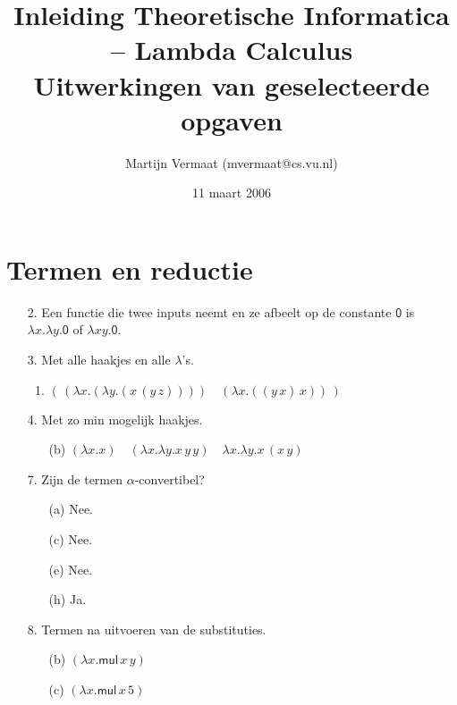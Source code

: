\documentclass[a4paper,11pt]{article}
\title{Inleiding Theoretische Informatica -- Lambda Calculus\\
\normalsize{Uitwerkingen van geselecteerde opgaven}}
\author{Martijn Vermaat (mvermaat@cs.vu.nl)}
\date{11 maart 2006}
\begin{document}
\maketitle


\section{Termen en reductie}


\begin{enumerate}


\item[2.]
Een functie die twee inputs neemt en ze afbeelt op de constante $\textsf{0}$ is
$\lambda x. \lambda y. \textsf{0}$ of $\lambda xy. \textsf{0}$.


\item[3.]
Met alle haakjes en alle $\lambda$'s.
\begin{enumerate}

\item
$( \, (\lambda x. (\lambda y. (x \, (y \, z)))) \quad (\lambda x. ((y \, x) \, x)) \, )$

\end{enumerate}


\item[4.]
Met zo min mogelijk haakjes.
\begin{enumerate}

\item[(b)]
$(\lambda x. x) \quad (\lambda x. \lambda y. x \, y \, y) \quad \lambda x. \lambda y. x \, (x \, y)$

\end{enumerate}


\item[7.]
Zijn de termen $\alpha$-convertibel?
\begin{enumerate}

\item[(a)] Nee.
\item[(c)] Nee.
\item[(e)] Nee.
\item[(h)] Ja.

\end{enumerate}


\item[8.]
Termen na uitvoeren van de substituties.
\begin{enumerate}

\item[(b)] $(\lambda x. \textsf{mul} \, x \, y)$

\item[(c)] $(\lambda x. \textsf{mul} \, x \, 5)$


\end{enumerate}
\end{enumerate}
\end{document}
